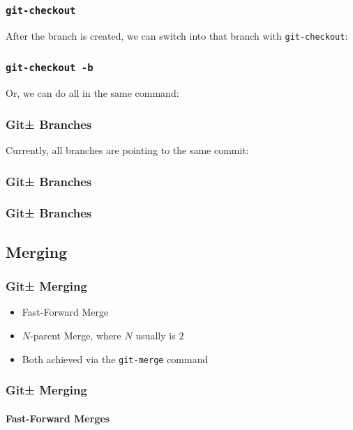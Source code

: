 \documentclass{beamer}
\begin{document}
\begin{frame}[fragile]
\frametitle{\texttt{git-checkout}}
After the branch is created, we can switch into that branch with
\texttt{git-checkout}:

\end{frame}

\begin{frame}[fragile]
\frametitle{\texttt{git-checkout -b}}
Or, we can do all in the same command:

\end{frame}

\begin{frame}[fragile]
\frametitle{Git± Branches}
Currently, all branches are pointing to the same commit:

\end{frame}

\begin{frame}[fragile]
\frametitle{Git± Branches}

\end{frame}

\begin{frame}[fragile]
\frametitle{Git± Branches}

\end{frame}

\subsection{Merging}
\begin{frame}
\frametitle{Git± Merging}
\begin{itemize}
\item{Fast-Forward Merge}
\item{$N$-parent Merge, where $N$ usually is $2$}
\item{Both achieved via the \texttt{git-merge} command}
\end{itemize}
\end{frame}

\begin{frame}
\frametitle{Git± Merging}
\framesubtitle{Fast-Forward Merges}
\begin{figure}
\end{figure}
\end{frame}
\end{document}
